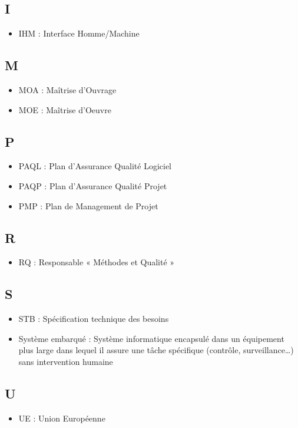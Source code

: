 \documentclass[a4paper]{article}
\begin{document}
\subsection{I}

\begin{itemize}
\item IHM : Interface Homme/Machine
\end{itemize}

\subsection{M}

\begin{itemize}
\item MOA : Maîtrise d’Ouvrage
\item MOE : Maîtrise d’Oeuvre
\end{itemize}

\subsection{P}

\begin{itemize}
\item PAQL : Plan d’Assurance Qualité Logiciel
\item PAQP : Plan d’Assurance Qualité Projet
\item PMP : Plan de Management de Projet
\end{itemize}

\subsection{R}

\begin{itemize}
\item RQ : Responsable « Méthodes et Qualité »
\end{itemize}

\subsection{S}

\begin{itemize}
\item STB : Spécification technique des besoins
\item Système embarqué : Système informatique encapsulé dans un équipement plus large dans
lequel il assure une tâche spécifique (contrôle, surveillance…) sans
intervention humaine
\end{itemize}

\subsection{U}

\begin{itemize}
\item UE : Union Européenne
\end{itemize}
\end{document}
